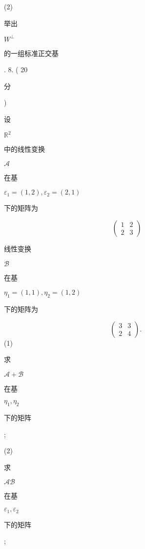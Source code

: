 \documentclass[10pt]{article}
\begin{document}
(2) \begin{CJK}{UTF8}{mj}举出\end{CJK} $W^{\perp}$ \begin{CJK}{UTF8}{mj}的一组标准正交基\end{CJK}. 8. ( 20 \begin{CJK}{UTF8}{mj}分\end{CJK}) \begin{CJK}{UTF8}{mj}设\end{CJK} $\mathbb{R}^{2}$ \begin{CJK}{UTF8}{mj}中的线性变换\end{CJK} $\mathscr{A}$ \begin{CJK}{UTF8}{mj}在基\end{CJK} $\varepsilon_{1}=(1,2), \varepsilon_{2}=(2,1)$ \begin{CJK}{UTF8}{mj}下的矩阵为\end{CJK}
$$
\left(\begin{array}{ll}
1 & 2 \\
2 & 3
\end{array}\right)
$$
\begin{CJK}{UTF8}{mj}线性变换\end{CJK} $\mathscr{B}$ \begin{CJK}{UTF8}{mj}在基\end{CJK} $\eta_{1}=(1,1), \eta_{2}=(1,2)$ \begin{CJK}{UTF8}{mj}下的矩阵为\end{CJK}
$$
\left(\begin{array}{ll}
3 & 3 \\
2 & 4
\end{array}\right) \text {. }
$$
(1) \begin{CJK}{UTF8}{mj}求\end{CJK} $\mathscr{A}+\mathscr{B}$ \begin{CJK}{UTF8}{mj}在基\end{CJK} $\eta_{1}, \eta_{2}$ \begin{CJK}{UTF8}{mj}下的矩阵\end{CJK};

(2) \begin{CJK}{UTF8}{mj}求\end{CJK} $\mathscr{A} \mathscr{B}$ \begin{CJK}{UTF8}{mj}在基\end{CJK} $\varepsilon_{1}, \varepsilon_{2}$ \begin{CJK}{UTF8}{mj}下的矩阵\end{CJK};
\end{document}
